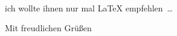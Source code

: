 \documentclass[ngerman,default_settings,address_Robin,signature_picture]{scrlttr2}
\begin{document}
\begin{letter}{\EmName\\ \EmAddress}
\Osehrgeehrte{\EmSex}{\EmNachname}

ich wollte ihnen nur mal \LaTeX{} empfehlen~\dots

\closing{Mit freudlichen Grüßen}
\end{letter}
\end{document}
